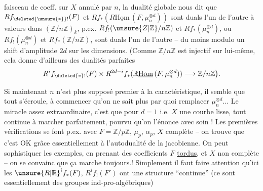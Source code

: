 faisceau de coeff. sur $X$ annulé par $n$, la dualité globale nous dit que $Rf_{\deleted{\unsure{*}}!}(F)$ et $Rf_*(R\underline{\mathrm{Hom}}\,(F,\mu_n^{\otimes d}))$ sont duals l'un de l'autre à valeurs dans $(\mathbb{Z}/n\mathbb{Z})_k$, p.ex. $Rf_!(\unsure{Z|\mathbb{Z}}/n\mathbb{Z})$ et $Rf_*(\mu_n^{\otimes d})$, ou $Rf_!(\mu_n^{\otimes d})$ et $Rf_*(\mathbb{Z}/n\mathbb{Z})$, sont duals l'un de l'autre -- du moins modulo un shift d'amplitude $2d$ sur les dimensions. (Comme $\mathbb{Z}/n\mathbb{Z}$ est injectif sur lui-même, cela donne d'ailleurs des dualités parfaites
\[
R^{i}f_{\deleted{*}!}(F)\times R^{2d-i}f_*(\mathbb{R}\underline{\mathrm{Hom}}\,(F,\mu_n^{\otimes d}))\longrightarrow\mathbb{Z}/n\mathbb{Z}\big{)}.
\]

Si maintenant $n$ n'est plus supposé premier à la caractéristique,  il semble que tout s'écroule, à commencer qu'on ne sait plus  par quoi remplacer $\mu_n^{\otimes d}$... Le miracle assez extraordinaire, c'est que pour $d=1$ i.e. $X$ une courbe lisse, tout continue à marcher parfaitement, pourvu qu'on l'énonce avec soin ! Les premières vérifications se font p.ex. avec $F=\mathbb{Z}/p\mathbb{Z}$, $\mu_p$, $\alpha_p$, $X$ complète -- on trouve que c'est OK grâce essentiellement à l'autodualité de la jacobienne. On peut sophistiquer les exemples, en prenant des coefficients $F$ \uline{tordus}, et $X$ non complète -- on se convainc que ça marche toujours.! Simplement il faut faire attention qu'ici les ${\unsure{R|\mathbb{R}}}^if_*(F)$, $R^if_!(F')$ ont une structure ``continue'' (ce sont essentiellement des groupes ind-pro-algébriques)

